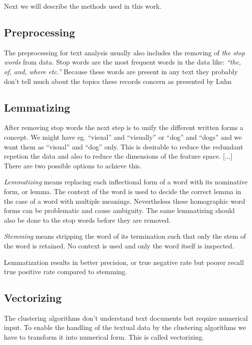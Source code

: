 Next we will describe the methods used in this work.


\subsection{Preprocessing}
The preprocessing for text analysis usually also includes the 
removing of \emph{the stop words} from data. Stop words are the 
most frequent words in the data like: \emph{``the, of, and, where 
etc.''} Because these words are present in any text they probably 
don't tell much about the topics these records concern as 
presented by Luhn \cite{luhn_key_1960}


\subsection{Lemmatizing}
After removing stop words the next step is to unify the 
different written forms a concept. We might have eg. ``visual'' 
and ``visually'' or ``dog'' and ``dogs'' and we want them as 
``visual'' and ``dog'' only. This is desirable to reduce the 
redundant repetion the data and also to reduce the dimensions of 
the feature space. [...] \cite{ref_here}
There are two possible options to achieve this. 

\emph{Lemmatizing} means replacing each inflectional form of a 
word with its nominative form, or lemma. The context of the word 
is used to decide the correct lemma in the case of a word with 
multiple meanings.   Nevertheless these homographic 
word forms can be problematic and cause ambiguity. The same 
lemmatizing should also be done to the stop words before they are 
removed.

\emph{Stemming} means stripping the word of its termination such 
that only the stem of the word is retained. No context is used 
and only the word itself is inspected.

Lemmatization results in better precision, or true negative rate 
but poorer recall true positive rate compared to stemming. 
\cite{ref_here}


\subsection{Vectorizing}
The clustering algorithms don't understand text documents but 
require numerical input. To enable the handling of the textual 
data by the clustering algorithms we have to transform it into 
numerical form. This is called vectorizing.

